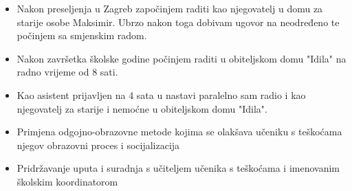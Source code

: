 \documentclass[10pt,a4paper,ragged2e,withhyper]{altacv}
\begin{document}
\begin{paracol}{2}
        \newpage
        
        \switchcolumn
        

        
            \begin{itemize}
                \item Nakon preseljenja u Zagreb započinjem raditi kao njegovatelj u domu za starije osobe Maksimir. Ubrzo nakon toga dobivam ugovor na neodređeno te počinjem sa smjenskim radom.
               
            \end{itemize}
            \divider
            
            \begin{itemize}
                \item Nakon završetka školske godine počinjem raditi u obiteljskom domu "Idila"  na radno vrijeme od 8 sati.
            \end{itemize}
            \divider
            
            \begin{itemize}
                \item Kao asistent prijavljen na 4 sata u nastavi paralelno sam radio i kao njegovatelj za starije i nemoćne u obiteljskom domu "Idila".
            \end{itemize}
            \divider
            
            \begin{itemize}
                \item Primjena odgojno-obrazovne metode kojima se olakšava učeniku s teškoćama njegov obrazovni proces i socijalizacija
                \item Pridržavanje uputa i suradnja s učiteljem učenika s teškoćama i imenovanim školskim koordinatorom
            \end{itemize}
            

\end{paracol}
\end{document}

